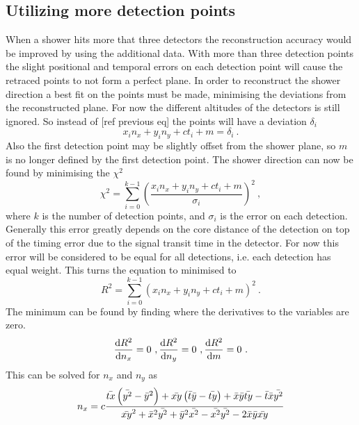 \subsection{Utilizing more detection points}

When a shower hits more that three detectors the reconstruction accuracy would be improved by using the additional data. With more than three detection points the slight positional and temporal errors on each detection point will cause the retraced points to not form a perfect plane. In order to reconstruct the shower direction a best fit on the points must be made, minimising the deviations from the reconstructed plane. For now the different altitudes of the detectors is still ignored. So instead of [ref previous eq] the points will have a deviation $\delta_i$
%
\begin{equation}
    x_i n_x + y_i n_y + c t_i + m = \delta_i \ .
\end{equation}
%
Also the first detection point may be slightly offset from the shower plane, so $m$ is no longer defined by the first detection point. The shower direction can now be found by minimising the $\chi^2$
%
\begin{equation}
    \chi^2 = \sum_{i = 0}^{k - 1}
             \left(\frac{x_i n_x + y_i n_y + c t_i + m}
                        {\sigma_i} \right)^2 \ ,
\end{equation}
%
where $k$ is the number of detection points, and $\sigma_i$ is the error on each detection. Generally this error greatly depends on the core distance of the detection on top of the timing error due to the signal transit time in the detector. For now this error will be considered to be equal for all detections, i.e. each detection has equal weight. This turns the equation to minimised to
%
\begin{equation}
    R^2 = \sum_{i=0}^{k-1} \left(x_i n_x + y_i n_y + c t_i + m \right)^2 \ .
\end{equation}
%
The minimum can be found by finding where the derivatives to the variables are zero.
%
\begin{equation}
    \frac{\mathrm{d} R^2}{\mathrm{d} n_x} = 0 \ ,
    \frac{\mathrm{d} R^2}{\mathrm{d} n_y} = 0 \ ,
    \frac{\mathrm{d} R^2}{\mathrm{d} m} = 0 \ .
\end{equation}
%
This can be solved for $n_x$ and $n_y$ as
%
\begin{equation}
n_x = c \frac{\bar{t x} \left( \bar{y^2} - \bar{y}^2 \right) +
              \bar{x y} \left( \bar{t} \bar{y} - \bar{t y} \right) +
              \bar{x} \bar{y} \bar{t y} - \bar{t} \bar{x} \bar{y^2}}
             {\bar{x y}^2 + \bar{x}^2 \bar{y^2} + \bar{y}^2 \bar{x^2} -
              \bar{x^2} \bar{y^2} - 2 \bar{x} \bar{y} \bar{x y}}
\end{equation}
